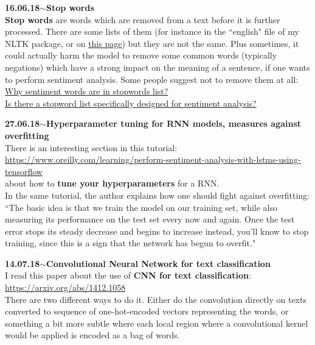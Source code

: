 \documentclass[11pt,a4paper]{article}
\newenvironment{loggentry}[2]%
{\noindent\textbf{#1}\hspace{1cm}$\mathbf{\sim}$\text{ }\textbf{#2}\\}{\vspace{0.5cm}}
\begin{document}
\begin{loggentry}{16.06.18}{Stop words}
\textbf{Stop words} are words which are removed from a text before it is further processed. There are some lists of them (for instance in the ``english" file of my NLTK package, or on \href{https://github.com/scikit-learn/scikit-learn/blob/a24c8b464d094d2c468a16ea9f8bf8d42d949f84/sklearn/feature_extraction/stop_words.py}{this page}) but they are not the same. Plus sometimes, it could actually harm the model to remove some common words (typically negations) which have a strong impact on the meaning of a sentence, if one wants to perform sentiment analysis. Some people suggest not to remove them at all:\\
\href{https://www.quora.com/Why-sentiment-words-are-in-stopwords-list}{Why sentiment words are in stopwords list?}\\
\href{https://www.quora.com/Is-there-a-stop-word-list-specifically-designed-for-sentiment-analysis}{Is there a stopword list specifically designed for sentiment analysis?}\\
\end{loggentry}

\begin{loggentry}{27.06.18}{Hyperparameter tuning for RNN models, measures against overfitting}
There is an interesting section in this tutorial:\\
\url{https://www.oreilly.com/learning/perform-sentiment-analysis-with-lstms-using-tensorflow}\\
about how to \textbf{tune your hyperparameters} for a RNN.\\

In the same tutorial, the author explains how one should fight against overfitting: ``The basic idea is that we train the model on our training set, while also measuring its performance on the test set every now and again. Once the test error stops its steady decrease and begins to increase instead, you'll know to stop training, since this is a sign that the network has begun to overfit."
\end{loggentry}

\begin{loggentry}{14.07.18}{Convolutional Neural Network for text classification}
I read this paper about the use of \textbf{CNN for text classification}:\\
\url{https://arxiv.org/abs/1412.1058}\\
There are two different ways to do it. Either do the convolution directly on texts converted to sequence of one-hot-encoded vectors representing the words, or something a bit more subtle where each local region where a convolutional kernel would be applied is encoded as a bag of words.
\end{loggentry}
\end{document}
